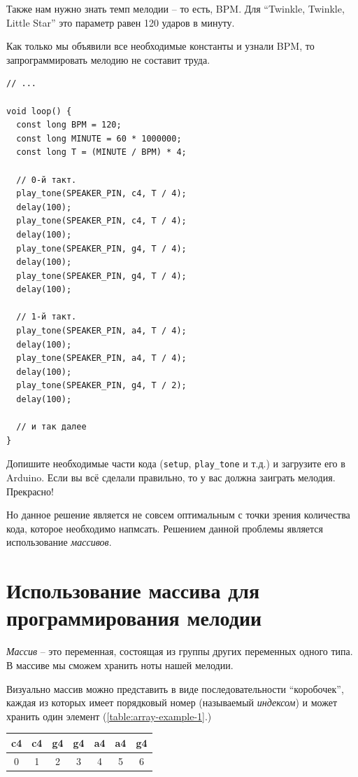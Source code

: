 \documentclass[a4paper,twoside]{book}
\begin{document}
Также нам нужно знать темп мелодии -- то есть, BPM. Для ``Twinkle, Twinkle,
Little Star'' это параметр равен 120 ударов в минуту.

Как только мы объявили все необходимые константы и узнали BPM, то
запрограммировать мелодию не составит труда.

\begin{verbatim}
// ...

void loop() {
  const long BPM = 120;
  const long MINUTE = 60 * 1000000;
  const long T = (MINUTE / BPM) * 4;

  // 0-й такт.
  play_tone(SPEAKER_PIN, c4, T / 4);
  delay(100);
  play_tone(SPEAKER_PIN, c4, T / 4);
  delay(100);
  play_tone(SPEAKER_PIN, g4, T / 4);
  delay(100);
  play_tone(SPEAKER_PIN, g4, T / 4);
  delay(100);

  // 1-й такт.
  play_tone(SPEAKER_PIN, a4, T / 4);
  delay(100);
  play_tone(SPEAKER_PIN, a4, T / 4);
  delay(100);
  play_tone(SPEAKER_PIN, g4, T / 2);
  delay(100);

  // и так далее
}
\end{verbatim}

Допишите необходимые части кода (\texttt{setup}, \texttt{play\_tone} и т.д.) и
загрузите его в Arduino. Если вы всё сделали правильно, то у вас должна заиграть
мелодия. Прекрасно!

Но данное решение является не совсем оптимальным с точки зрения количества кода,
которое необходимо напмсать. Решением данной проблемы является использование
\emph{массивов}.

\section{Использование массива для программирования мелодии}

\emph{Массив} -- это переменная, состоящая из группы других переменных одного
типа. В массиве мы сможем хранить ноты нашей мелодии.

Визуально массив можно представить в виде последовательности ``коробочек'',
каждая из которых имеет порядковый номер (называемый \emph{индексом}) и может
хранить один элемент (\ref{table:array-example-1}.)

\begin{tabular}{|p{1cm}|p{1cm}|p{1cm}|p{1cm}|p{1cm}|p{1cm}|p{1cm}|}
  \hline
  c4 & c4 & g4 & g4 & a4 & a4 & g4 \\
  \hline
  \multicolumn{1}{c}{0}
  & \multicolumn{1}{c}{1}
  & \multicolumn{1}{c}{2}
  & \multicolumn{1}{c}{3}
  & \multicolumn{1}{c}{4}
  & \multicolumn{1}{c}{5}
  & \multicolumn{1}{c}{6}
  \label{table:array-example-1}
\end{tabular}
\end{document}
